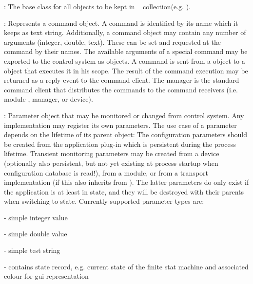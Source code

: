 \begin{compactdesc}
\item[\class{dabc::Basic}] : The base class for all objects to be kept in 
   \dabc~ collection(e.g. ).
\item[\class{dabc::Command}] : Represents a command object. A command 
   is identified by its name which it keeps as text string. Additionally, 
   a command object may contain any number of arguments (integer, double, text). 
   These can be set and requested at the command by their names. 
   The available arguments of a special command may be exported to the control 
   system as  objects. A command is sent from a 
    object to a  object
    that executes it in his scope. 
   The result of the command execution may be returned as a reply event to 
   the command client. The manager is the standard command client 
   that distributes the commands to the command receivers 
   (i.e. module , manager, or device). 
\item[\class{dabc::Parameter}] : Parameter object that may be monitored or 
   changed from control system. Any  implementation 
   may register its own parameters. The use case of a parameter 
   depends on the lifetime of its parent object: The configuration 
   parameters should be created from the application plug-in which 
   is persistent during the process lifetime. Transient monitoring parameters 
   may be created from a device (optionally also persistent, but not 
   yet existing at process startup when configuration database is read!), 
   from a module, or from a transport implementation (if this 
   also inherits from ). The latter parameters 
   do only exist if the application is at least in  state, and 
   they will be destroyed with their parents when switching to  state. 
   Currently supported parameter types are:
\begin{compactitem}[$\bullet$]
\item {}    - simple integer value
\item {} - simple double value
\item {} - simple test string
\item {} - contains state record, e.g. current 
      state of the finite stat machine and associated colour for gui representation

\end{compactitem}
\end{compactdesc}
